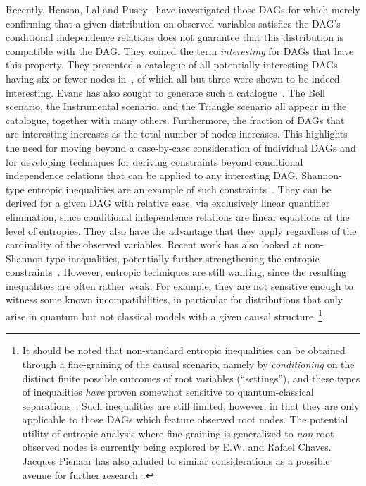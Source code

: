 \documentclass[aps,english,10pt,superscriptaddress,onecolumn,twoside,longbibliography,pra,floatfix,fleqn,nofootinbib]{revtex4-1}%
\theoremstyle{definition}
\newcounter{example}[section]
\begin{document}
Recently, Henson, Lal and Pusey~\cite{pusey2014gdag} have investigated those DAGs for which merely confirming that a given distribution on observed variables satisfies the DAG's conditional independence relations does not guarantee that this distribution is compatible with the DAG.  They coined the term \emph{interesting} for DAGs that have this property. They presented a catalogue of all potentially interesting DAGs having six or fewer nodes in~\cite[App.~E]{pusey2014gdag}, of which all but three were shown to be indeed interesting. Evans has also sought to generate such a catalogue~\cite{evans2012graphical}. The Bell scenario, the Instrumental scenario, and the Triangle scenario all appear in the catalogue, together with many others.   Furthermore, the fraction of DAGs that are interesting increases as the total number of nodes increases.  This highlights the need for moving beyond a case-by-case consideration of individual DAGs and for developing techniques for deriving constraints beyond conditional independence relations that can be applied to any interesting DAG. 
Shannon-type entropic inequalities are an example of such constraints~\cite{steudel2010ancestors,fritz2012bell,fritz2013marginal,chaves2014novel,chaves2014informationinference}. They can be derived for a given DAG with relative ease, via exclusively linear quantifier elimination, since conditional independence relations are linear equations at the level of entropies. They also have the advantage that they apply regardless of the cardinality of the observed variables. Recent work has also looked at non-Shannon type inequalities, potentially further strengthening the entropic constraints~\cite{weilenmann2016entropic,pianaar2016interesting}. However, entropic techniques are still wanting, since the resulting inequalities are often rather weak. For example, they are not sensitive enough to witness some known incompatibilities, in particular for distributions that only arise in quantum but not classical models with a given causal structure~\cite{fritz2012bell,weilenmann2016entropic}\footnote{It should be noted that non-standard entropic inequalities can be obtained through a fine-graining of the causal scenario, namely by \emph{conditioning} on the distinct finite possible outcomes of root variables (``settings''), and these types of inequalities \emph{have} proven somewhat sensitive to quantum-classical separations~\cite{braunstein1988entropic,SchumacherInequality,chaves2014novel}. Such inequalities are still limited, however, in that they are only applicable to those DAGs which feature observed root nodes. The potential utility of entropic analysis where fine-graining is generalized to \emph{non}-root observed nodes is currently being explored by E.W. and Rafael Chaves. Jacques Pienaar has also alluded to similar considerations as a possible avenue for further research~\cite{pianaar2016interesting}.}.
\end{document}
